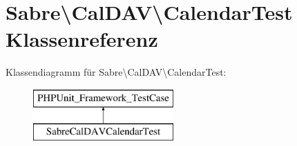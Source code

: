 \hypertarget{class_sabre_1_1_cal_d_a_v_1_1_calendar_test}{}\section{Sabre\textbackslash{}Cal\+D\+AV\textbackslash{}Calendar\+Test Klassenreferenz}
\label{class_sabre_1_1_cal_d_a_v_1_1_calendar_test}
Klassendiagramm für Sabre\textbackslash{}Cal\+D\+AV\textbackslash{}Calendar\+Test\+:\begin{figure}[H]
\begin{center}
\leavevmode
\includegraphics[height=2.000000cm]{class_sabre_1_1_cal_d_a_v_1_1_calendar_test}
\end{center}
\end{figure}
